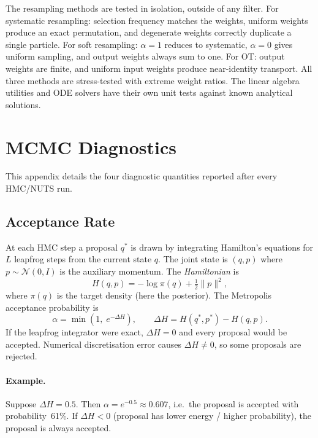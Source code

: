 \documentclass{article}
\begin{document}
The resampling methods are tested in isolation, outside of any filter. For systematic resampling: selection frequency matches the weights, uniform weights produce an exact permutation, and degenerate weights correctly duplicate a single particle. For soft resampling: $\alpha = 1$ reduces to systematic, $\alpha = 0$ gives uniform sampling, and output weights always sum to one. For OT: output weights are finite, and uniform input weights produce near-identity transport. All three methods are stress-tested with extreme weight ratios. The linear algebra utilities and ODE solvers have their own unit tests against known analytical solutions.



\newpage
\section{MCMC Diagnostics}\label{app:mcmc_diagnostics}

This appendix details the four diagnostic quantities reported after every HMC/NUTS run.

\subsection{Acceptance Rate}

At each HMC step a proposal $q^*$ is drawn by integrating Hamilton's equations for $L$ leapfrog
steps from the current state $q$.  The joint state is $(q, p)$ where $p \sim \mathcal{N}(0, I)$ is
the auxiliary momentum.  The \emph{Hamiltonian} is
\begin{equation}
  H(q, p) = -\log \pi(q) + \tfrac{1}{2}\|p\|^2,
\end{equation}
where $\pi(q)$ is the target density (here the posterior).  The Metropolis acceptance probability is
\begin{equation}
  \alpha = \min\!\left(1,\; e^{-\Delta H}\right), \qquad
  \Delta H = H(q^*, p^*) - H(q, p).
\end{equation}
If the leapfrog integrator were exact, $\Delta H = 0$ and every proposal would be accepted.
Numerical discretisation error causes $\Delta H \neq 0$, so some proposals are rejected.

\paragraph{Example.}
Suppose $\Delta H = 0.5$.  Then $\alpha = e^{-0.5} \approx 0.607$, i.e.\ the proposal is accepted
with probability~61\%.  If $\Delta H < 0$ (proposal has lower energy / higher probability), the
proposal is always accepted.
\end{document}
